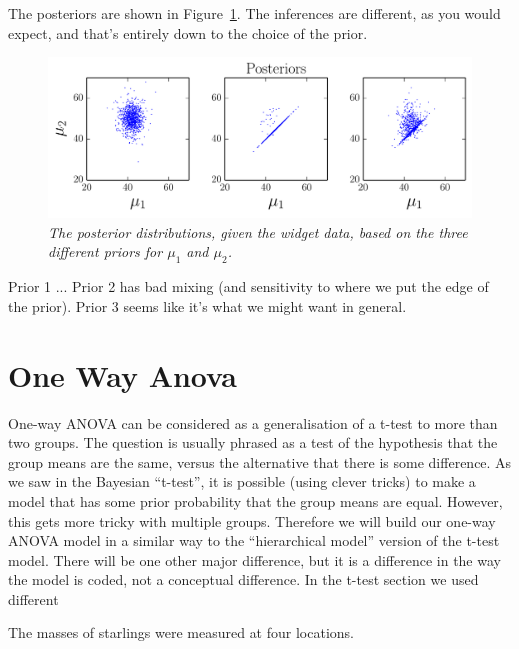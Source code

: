 The posteriors are shown in Figure~\ref{fig:ttest2}.
The inferences are different, as you would expect, and that's entirely down
to the choice of the prior.
\begin{figure}[h]
\begin{center}
\includegraphics[scale=0.8]{Figures/ttest2.pdf}
\caption{\it The posterior distributions, given the widget data,
based on the three different priors for $\mu_1$ and $\mu_2$.\label{fig:ttest2}}
\end{center}
\end{figure}


Prior 1 ...
Prior 2 has bad mixing (and sensitivity to where we put the edge of the prior).
Prior 3 seems like it's what we might want in general.


\section{One Way Anova}
One-way ANOVA can be considered as a generalisation of a t-test to more than
two groups. The question is usually phrased as a test of the hypothesis that
the group means are the same, versus the alternative that there is some difference.
As we saw in the Bayesian ``t-test'', it is possible (using clever tricks) to
make a model that has some prior probability that the group means are equal.
However, this gets more tricky with multiple groups. Therefore we will build our
one-way ANOVA model in a similar way to the ``hierarchical model'' version of the
t-test model. There will be one other major difference, but it is a difference
in the way the model is coded, not a conceptual difference. In the t-test
section we used different 

The masses of starlings were measured at four locations.

